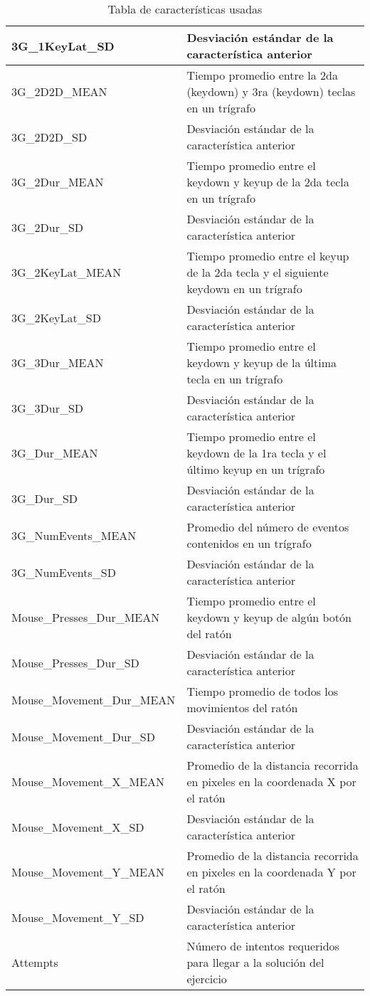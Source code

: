 \begin{center}
\begin{table}
\begin{tabular}{| p{4cm} | p{10cm} |}
    3G\_1KeyLat\_SD & Desviación estándar de la característica anterior \\ \hline
    3G\_2D2D\_MEAN & Tiempo promedio entre la 2da (keydown) y 3ra
    (keydown) teclas en un trígrafo \\ \hline
    3G\_2D2D\_SD & Desviación estándar de la característica anterior \\ \hline
    3G\_2Dur\_MEAN & Tiempo promedio entre el keydown y keyup de la 2da
    tecla en un trígrafo \\ \hline
    3G\_2Dur\_SD & Desviación estándar de la característica anterior \\ \hline
    3G\_2KeyLat\_MEAN & Tiempo promedio entre el keyup de la 2da tecla y
    el siguiente keydown en un trígrafo\\ \hline
    3G\_2KeyLat\_SD & Desviación estándar de la característica anterior \\ \hline
    3G\_3Dur\_MEAN & Tiempo promedio entre el keydown y keyup de la
    última tecla en un trígrafo \\ \hline
    3G\_3Dur\_SD & Desviación estándar de la característica anterior \\ \hline
    3G\_Dur\_MEAN & Tiempo promedio entre el keydown de la 1ra tecla y
    el último keyup en un trígrafo \\ \hline
    3G\_Dur\_SD & Desviación estándar de la característica anterior \\ \hline
    3G\_NumEvents\_MEAN & Promedio del número de eventos contenidos en
    un trígrafo \\ \hline
    3G\_NumEvents\_SD & Desviación estándar de la característica anterior \\ \hline
    Mouse\_Presses\_Dur\_MEAN & Tiempo promedio entre el keydown y keyup
    de algún botón del ratón \\ \hline
    Mouse\_Presses\_Dur\_SD & Desviación estándar de la característica anterior \\ \hline
    Mouse\_Movement\_Dur\_MEAN & Tiempo promedio de todos los movimientos
    del ratón\\ \hline
    Mouse\_Movement\_Dur\_SD & Desviación estándar de la característica anterior \\ \hline
    Mouse\_Movement\_X\_MEAN & Promedio de la distancia recorrida en
    pixeles en la coordenada X por el ratón \\ \hline
    Mouse\_Movement\_X\_SD & Desviación estándar de la característica anterior \\ \hline
    Mouse\_Movement\_Y\_MEAN & Promedio de la distancia recorrida en
    pixeles en la coordenada Y por el ratón \\ \hline
    Mouse\_Movement\_Y\_SD & Desviación estándar de la característica anterior \\ \hline
    Attempts & Número de intentos requeridos para llegar a la
    solución del ejercicio \\ \hline
  \end{tabular}
  \caption{Tabla de características usadas}
  \end{table}
\end{center}

